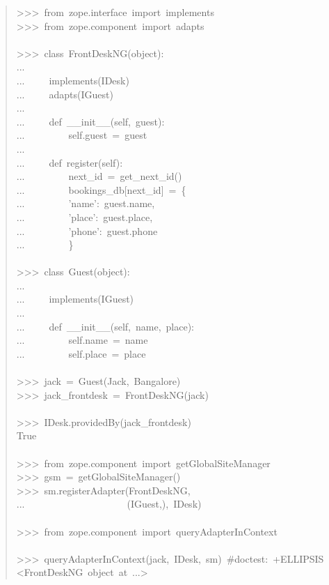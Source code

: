 \documentclass[14pt,a4paper,openany,twoside,final]{extbook}
\begin{document}
\begin{quote}
{>{}>{}>~from~zope.interface~import~implements\\
>{}>{}>~from~zope.component~import~adapts\\
~\\
>{}>{}>~class~FrontDeskNG(object):\\
...\\
...~~~~~implements(IDesk)\\
...~~~~~adapts(IGuest)\\
...\\
...~~~~~def~\_\_init\_\_(self,~guest):\\
...~~~~~~~~~self.guest~=~guest\\
...\\
...~~~~~def~register(self):\\
...~~~~~~~~~next\_id~=~get\_next\_id()\\
...~~~~~~~~~bookings\_db{[}next\_id{]}~=~\{\\
...~~~~~~~~~'name':~guest.name,\\
...~~~~~~~~~'place':~guest.place,\\
...~~~~~~~~~'phone':~guest.phone\\
...~~~~~~~~~\}\\
~\\
>{}>{}>~class~Guest(object):\\
...\\
...~~~~~implements(IGuest)\\
...\\
...~~~~~def~\_\_init\_\_(self,~name,~place):\\
...~~~~~~~~~self.name~=~name\\
...~~~~~~~~~self.place~=~place\\
~\\
>{}>{}>~jack~=~Guest(\textquotedbl{}Jack\textquotedbl{},~\textquotedbl{}Bangalore\textquotedbl{})\\
>{}>{}>~jack\_frontdesk~=~FrontDeskNG(jack)\\
~\\
>{}>{}>~IDesk.providedBy(jack\_frontdesk)\\
True\\
~\\
>{}>{}>~from~zope.component~import~getGlobalSiteManager\\
>{}>{}>~gsm~=~getGlobalSiteManager()\\
>{}>{}>~sm.registerAdapter(FrontDeskNG,\\
...~~~~~~~~~~~~~~~~~~~~~(IGuest,),~IDesk)\\
~\\
>{}>{}>~from~zope.component~import~queryAdapterInContext\\
~\\
>{}>{}>~queryAdapterInContext(jack,~IDesk,~sm)~\#doctest:~+ELLIPSIS\\
<FrontDeskNG~object~at~...>
}
\end{quote}
\end{document}
